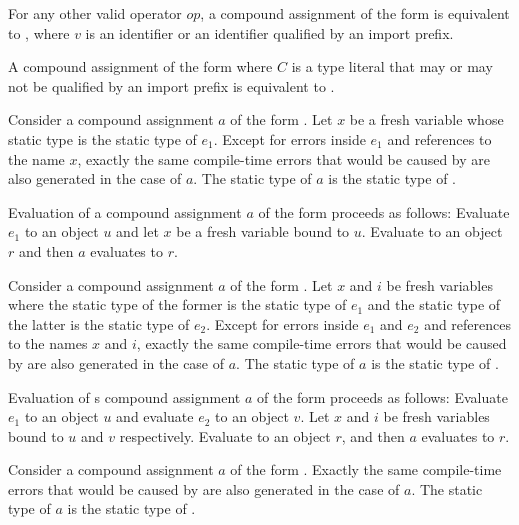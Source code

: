 \documentclass[makeidx]{article}
\begin{document}
\LMHash{}%
For any other valid operator $op$, a compound assignment of the form 
is equivalent to ,
where $v$ is an identifier or an identifier qualified by an import prefix.

\LMHash{}%
A compound assignment of the form 
where $C$ is a type literal
that may or may not be qualified by an import prefix
is equivalent to .

\LMHash{}%
Consider a compound assignment $a$ of the form .
Let $x$ be a fresh variable whose static type is the static type of $e_1$.
Except for errors inside $e_1$ and references to the name $x$,
exactly the same compile-time errors that would be caused by  are also generated in the case of $a$.
The static type of $a$ is the static type of .

\LMHash{}%
Evaluation of a compound assignment $a$ of the form 
proceeds as follows:
Evaluate $e_1$ to an object $u$ and let $x$ be a fresh variable bound to $u$.
Evaluate  to an object $r$
and then $a$ evaluates to $r$.

\LMHash{}%
Consider a compound assignment $a$ of the form .
Let $x$ and $i$ be fresh variables
where the static type of the former is the static type of $e_1$
and the static type of the latter is the static type of $e_2$.
Except for errors inside $e_1$ and $e_2$ and references to the names $x$ and $i$,
exactly the same compile-time errors that would be caused by  are also generated in the case of $a$.
The static type of $a$ is the static type of .

\LMHash{}%
Evaluation of s compound assignment $a$ of the form 
proceeds as follows:
Evaluate $e_1$ to an object $u$ and evaluate $e_2$ to an object $v$.
Let $x$ and $i$ be fresh variables bound to $u$ and $v$ respectively.
Evaluate  to an object $r$,
and then $a$ evaluates to $r$.

\LMHash{}%
Consider a compound assignment $a$ of the form .
Exactly the same compile-time errors that would be caused by  are also generated in the case of $a$.
The static type of $a$ is the static type of .
\end{document}
